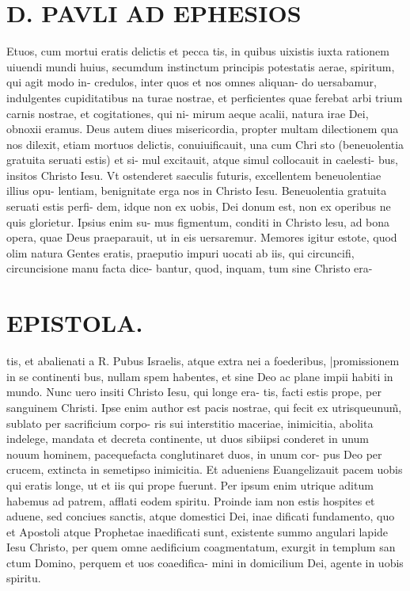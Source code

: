 \documentclass{article}
\begin{document}
\begin{pages}
\section*{D. PAVLI AD EPHESIOS }
\marginpar{[ p.1. ]}
\marginpar{[ p.2. ]}
\marginpar{[ p.3. ]}
\marginpar{[ p.4. ]}\pstart Etuos, cum mortui eratis delictis et pecca tis, in quibus uixistis iuxta rationem uiuendi mundi huius, secumdum instinctum principis potestatis aerae, spiritum, qui agit modo in- credulos, inter quos et nos omnes aliquan- do uersabamur, indulgentes cupiditatibus na turae nostrae, et perficientes quae ferebat arbi trium carnis nostrae, et cogitationes, qui ni- mirum aeque acalii, natura irae Dei, obnoxii eramus.  \pend\pstart Deus autem diues misericordia, propter multam dilectionem qua nos dilexit, etiam mortuos delictis, conuiuificauit, una cum Chri sto (beneuolentia gratuita seruati estis) et si- mul excitauit, atque simul collocauit in caelesti- bus, insitos Christo Iesu. Vt ostenderet saeculis futuris, excellentem beneuolentiae illius opu- lentiam, benignitate erga nos in Christo Iesu.  \pend\pstart Beneuolentia gratuita seruati estis perfi- dem, idque non ex uobis, Dei donum est, non ex operibus ne quis glorietur. Ipsius enim su- mus figmentum, conditi in Christo lesu, ad bona opera, quae Deus praeparauit, ut in eis uersaremur.  \pend\pstart Memores igitur estote, quod olim natura Gentes eratis, praeputio impuri uocati ab iis, qui circuncifi, circuncisione manu facta dice- bantur, quod, inquam, tum sine Christo era-  \pend
\section*{EPISTOLA. }
\marginpar{[ p.11 ]}
\marginpar{[ p.50 ]}
\marginpar{[ p.60 ]}
\marginpar{[ p.70 ]}\pstart tis, et abalienati a R. Pubus  Israelis, atque extra nei a foederibus, |promissionem in se continenti bus, nullam spem habentes, et sine Deo ac plane impii habiti in mundo.  \pend\pstart Nunc uero insiti Christo Iesu, qui longe era- tis, facti estis prope, per sanguinem Christi. Ipse enim author est pacis nostrae, qui fecit ex utrisqueunum̃, sublato per sacrificium corpo- ris sui interstitio maceriae, inimicitia, abolita indelege, mandata et decreta continente, ut duos sibiipsi conderet in unum nouum hominem, pacequefacta conglutinaret duos, in unum cor- pus Deo per crucem, extincta in semetipso inimicitia.  \pend\pstart Et adueniens Euangelizauit pacem uobis qui eratis longe, ut et iis qui prope fuerunt. Per ipsum enim utrique aditum habemus ad patrem, afflati eodem spiritu.  \pend\pstart Proinde iam non estis hospites et aduene, sed conciues sanctis, atque domestici Dei, inae dificati fundamento, quo et Apostoli atque Prophetae inaedificati sunt, existente summo angulari lapide Iesu Christo, per quem omne aedificium coagmentatum, exurgit in templum san ctum Domino, perquem et uos coaedifica- mini in domicilium Dei, agente in uobis spiritu.  \pend

\end{pages}
\end{document}
